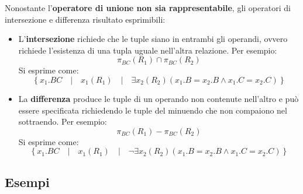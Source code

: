 \documentclass[a4paper]{article}
\begin{document}
	\noindent
	Nonostante l'\textbf{operatore di unione non sia rappresentabile}, gli operatori di intersezione e differenza risultato esprimibili:
	\begin{itemize}
		\item L'\textbf{intersezione} richiede che le tuple siano in entrambi gli operandi, ovvero richiede l'esistenza di una tupla uguale nell'altra relazione. Per esempio:
		\begin{equation*}
			\pi_{BC}\left(R_{1}\right) \cap \pi_{BC}\left(R_{2}\right)
		\end{equation*}
		Si esprime come:
		\begin{equation*}
			\left\{x_{1}.BC \hspace{1em} |
			\hspace{1em} x_{1}\left(R_{1}\right) \hspace{1em} |
			\hspace{1em} \exists x_{2}\left(R_{2}\right)\left(x_{1}.B = x_{2}.B \land x_{1}.C = x_{2}.C\right)\right\}
		\end{equation*}
	
		\item La \textbf{differenza} produce le tuple di un operando non contenute nell'altro e può essere specificata richiedendo le tuple del minuendo che non compaiono nel sottraendo. Per esempio:
		\begin{equation*}
			\pi_{BC}\left(R_{1}\right) - \pi_{BC}\left(R_{2}\right)
		\end{equation*}
		Si esprime come:
		\begin{equation*}
			\left\{x_{1}.BC \hspace{1em} |
			\hspace{1em} x_{1}\left(R_{1}\right) \hspace{1em} |
			\hspace{1em} \lnot\exists x_{2}\left(R_{2}\right)\left(x_{1}.B = x_{2}.B \land x_{1}.C = x_{2}.C\right)\right\}
		\end{equation*}
	\end{itemize}\newpage
	
	\subsection[Esempi]{\textcolor{Green4}{Esempi}}
	
\end{document}
